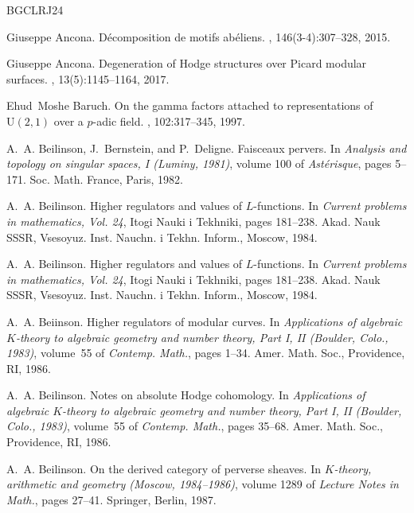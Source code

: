 \documentclass[11pt, a4paper]{amsart}
\theoremstyle{plain}
\theoremstyle{definition}
\numberwithin{equation}{section}
\begin{document}
\begin{thebibliography}{BGCLRJ24}

Giuseppe Ancona.
\newblock D\'{e}composition de motifs ab\'{e}liens.
, 146(3-4):307--328, 2015.

Giuseppe Ancona.
\newblock Degeneration of {H}odge structures over {P}icard modular surfaces.
, 13(5):1145--1164, 2017.

Ehud~Moshe Baruch.
\newblock On the gamma factors attached to representations of {${\mathrm
  U}(2,1)$} over a {$p$}-adic field.
, 102:317--345, 1997.

A.~A. Beilinson, J.~Bernstein, and P.~Deligne.
\newblock Faisceaux pervers.
\newblock In {\em Analysis and topology on singular spaces, {I} ({L}uminy,
  1981)}, volume 100 of {\em Ast\'erisque}, pages 5--171. Soc. Math. France,
  Paris, 1982.

A.~A. Beilinson.
\newblock Higher regulators and values of {$L$}-functions.
\newblock In {\em Current problems in mathematics, {V}ol. 24}, Itogi Nauki i
  Tekhniki, pages 181--238. Akad. Nauk SSSR, Vsesoyuz. Inst. Nauchn. i Tekhn.
  Inform., Moscow, 1984.

A.~A. Beilinson.
\newblock Higher regulators and values of {$L$}-functions.
\newblock In {\em Current problems in mathematics, {V}ol. 24}, Itogi Nauki i
  Tekhniki, pages 181--238. Akad. Nauk SSSR, Vsesoyuz. Inst. Nauchn. i Tekhn.
  Inform., Moscow, 1984.

A.~A. Beiinson.
\newblock Higher regulators of modular curves.
\newblock In {\em Applications of algebraic {$K$}-theory to algebraic geometry
  and number theory, {P}art {I}, {II} ({B}oulder, {C}olo., 1983)}, volume~55 of
  {\em Contemp. Math.}, pages 1--34. Amer. Math. Soc., Providence, RI, 1986.

A.~A. Beilinson.
\newblock Notes on absolute {H}odge cohomology.
\newblock In {\em Applications of algebraic {$K$}-theory to algebraic geometry
  and number theory, {P}art {I}, {II} ({B}oulder, {C}olo., 1983)}, volume~55 of
  {\em Contemp. Math.}, pages 35--68. Amer. Math. Soc., Providence, RI, 1986.

A.~A. Beilinson.
\newblock On the derived category of perverse sheaves.
\newblock In {\em {$K$}-theory, arithmetic and geometry ({M}oscow,
  1984--1986)}, volume 1289 of {\em Lecture Notes in Math.}, pages 27--41.
  Springer, Berlin, 1987.


\end{thebibliography}
\end{document}
